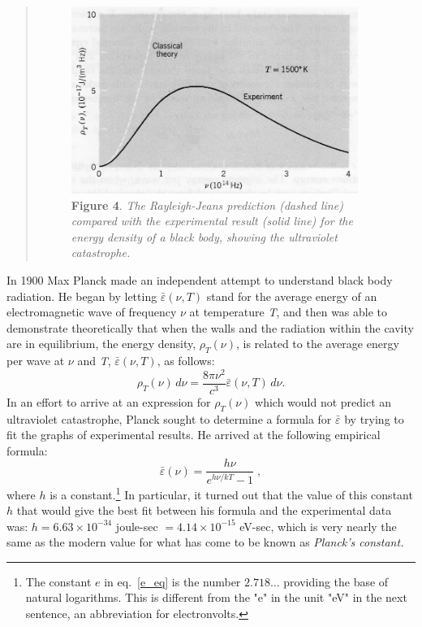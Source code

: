 \begin{quotation}
%
\begin{figure}[h]
  \centering
  \captionsetup{width=3.67708in}
  \includegraphics[width=3.67708in,height=2.39583in]{images/05_planck/image017.jpg}
  \caption*{\textbf{Figure 4}. \emph{The Rayleigh-Jeans prediction (dashed line) compared
    with the experimental result (solid line) for the energy density of a
    black body, showing the ultraviolet catastrophe.}}
\end{figure}
%
\end{quotation}

In 1900 Max Planck made an independent attempt to understand black body
radiation. He began by letting $\bar{\varepsilon}(\nu, T)$ stand for the average
energy of an electromagnetic wave of frequency $\nu$ at temperature
\emph{T}, and then was able to demonstrate theoretically that when the
walls and the radiation within the cavity are in equilibrium, the energy
density, $\rho_T(\nu)$, is related to the average
energy per wave at $\nu$ and \emph{T}, $\bar{\varepsilon}(\nu, T)$, as follows:
%
\setcounter{equation}{9}
\begin{equation}\label{eq:planck_10}
\rho_T(\nu)\, d\nu = \frac{8\pi \nu^2}{c^3}\bar{\varepsilon}(\nu, T)\, d\nu. %
\end{equation}
%
In an effort to arrive at an expression for $\rho_T(\nu)$
which would not predict an ultraviolet catastrophe, Planck sought to
determine a formula for $\bar{\varepsilon}$ by trying to fit the graphs of experimental
results. He arrived at the following empirical formula:
\begin{equation}\label{e_eq}
\bar{\varepsilon}(\nu) = \frac{h\nu}{e^{h\nu/kT}-1} \; , %
\end{equation}
where $h$ is a constant.\footnote{The constant $e$ in eq.~\eqref{e_eq} is the number $2.718\dots$ providing the base of natural logarithms. This is different from the "e" in the unit "eV" in the next sentence, an abbreviation for electronvolts.} In particular, it turned out that the
value of this constant $h$ that would give the best fit between his
formula and the experimental data was: $h = 6.63\! \times\!
10^{-34}$ joule-sec $= 4.14\! \times\! 10^{-15}$
eV-sec, which is very nearly the same as the modern value for what has
come to be known as \emph{Planck's constant.}

